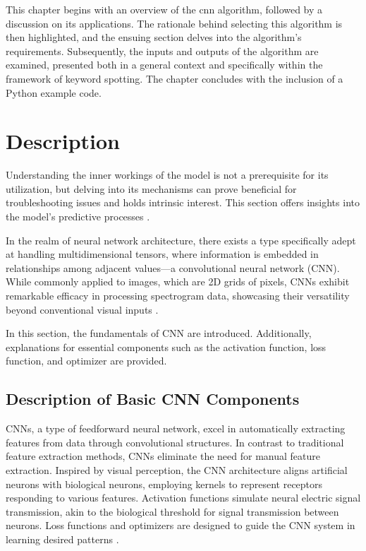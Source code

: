 This chapter begins with an overview of the \ac{cnn} algorithm, followed by a discussion on its applications. The rationale behind selecting this algorithm is then highlighted, and the ensuing section delves into the algorithm's requirements. Subsequently, the inputs and outputs of the algorithm are examined, presented both in a general context and specifically within the framework of keyword spotting. The chapter concludes with the inclusion of a Python example code.


\section{Description}

Understanding the inner workings of the model is not a prerequisite for its utilization, but delving into its mechanisms can prove beneficial for troubleshooting issues and holds intrinsic interest. This section offers insights into the model's predictive processes \cite{Warden:2019}.

In the realm of neural network architecture, there exists a type specifically adept at handling multidimensional tensors, where information is embedded in relationships among adjacent values—a convolutional neural network (CNN). While commonly applied to images, which are 2D grids of pixels, CNNs exhibit remarkable efficacy in processing spectrogram data, showcasing their versatility beyond conventional visual inputs \cite{Warden:2019}.

In this section, the fundamentals of CNN are introduced. Additionally, explanations for essential components such as the activation function, loss function, and optimizer are provided.

\subsection{Description of Basic CNN Components}

CNNs, a type of feedforward neural network, excel in automatically extracting features from data through convolutional structures. In contrast to traditional feature extraction methods, CNNs eliminate the need for manual feature extraction. Inspired by visual perception, the CNN architecture aligns artificial neurons with biological neurons, employing kernels to represent receptors responding to various features. Activation functions simulate neural electric signal transmission, akin to the biological threshold for signal transmission between neurons. Loss functions and optimizers are designed to guide the CNN system in learning desired patterns \cite{Li:2021}.

